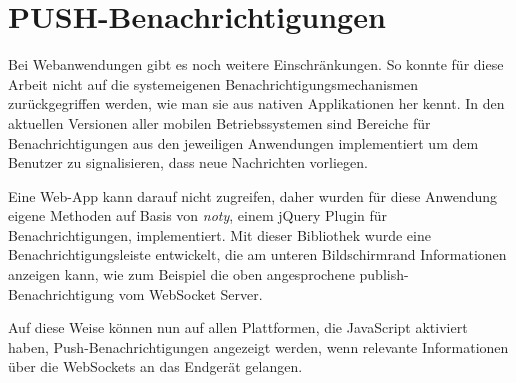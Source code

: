 \section{PUSH-Benachrichtigungen}
Bei Webanwendungen gibt es noch weitere Einschränkungen. So konnte für diese Arbeit nicht auf die systemeigenen Benachrichtigungsmechanismen zurückgegriffen werden, wie man sie aus nativen Applikationen her kennt. In den aktuellen Versionen aller mobilen Betriebssystemen sind Bereiche für Benachrichtigungen aus den jeweiligen Anwendungen implementiert um dem Benutzer zu signalisieren, dass neue Nachrichten vorliegen.\par

Eine Web-App kann darauf nicht zugreifen, daher wurden für diese Anwendung eigene Methoden auf Basis von \emph{noty}, einem jQuery Plugin für Benachrichtigungen, implementiert. Mit dieser Bibliothek wurde eine Benachrichtigungsleiste entwickelt, die am unteren Bildschirmrand Informationen anzeigen kann, wie zum Beispiel die oben angesprochene publish-Benachrichtigung vom WebSocket Server.\par

Auf diese Weise können nun auf allen Plattformen, die JavaScript aktiviert haben, Push-Benachrichtigungen angezeigt werden, wenn relevante Informationen über die WebSockets an das Endgerät gelangen.














